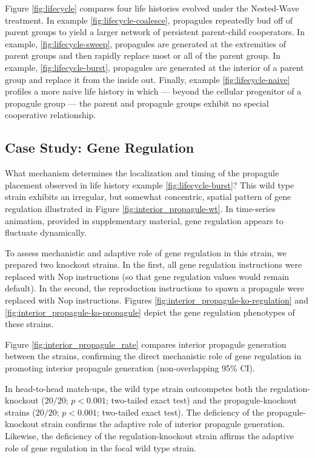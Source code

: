 Figure \ref{fig:lifecycle} compares four life histories evolved under the Nested-Wave treatment.
In example \ref{fig:lifecycle-coalesce}, propagules repeatedly bud off of parent groups to yield a larger network of persistent parent-child cooperators.
In example, \ref{fig:lifecycle-sweep}, propagules are generated at the extremities of parent groups and then rapidly replace most or all of the parent group.
In example, \ref{fig:lifecycle-burst}, propagules are generated at the interior of a parent group and replace it from the inside out.
Finally, example \ref{fig:lifecycle-naive} profiles a more naive life history in which --- beyond the cellular progenitor of a propagule group --- the parent and propagule groups exhibit no special cooperative relationship.

\subsection{Case Study: Gene Regulation} \label{sec:gene-regulation}



What mechanism determines the localization and timing of the propagule placement observed in life history example \ref{fig:lifecycle-burst}?
This wild type strain exhibits an irregular, but somewhat concentric, spatial pattern of gene regulation illustrated in Figure \ref{fig:interior_propagule-wt}.
In time-series animation, provided in supplementary material, gene regulation appears to fluctuate dynamically.

To assess mechanistic and adaptive role of gene regulation in this strain, we prepared two knockout strains.
In the first, all gene regulation instructions were replaced with Nop instructions (so that gene regulation values would remain default).
In the second, the reproduction instructions to spawn a propagule were replaced with Nop instructions.
Figures \ref{fig:interior_propagule-ko-regulation} and \ref{fig:interior_propagule-ko-propagule} depict the gene regulation phenotypes of these strains.

Figure \ref{fig:interior_propagule_rate} compares interior propagule generation between the strains, confirming the direct mechanistic role of gene regulation in promoting interior propagule generation (non-overlapping 95\% CI).

In head-to-head match-ups, the wild type strain outcompetes both the regulation-knockout ($20/20$; $p < 0.001$; two-tailed exact test) and the propagule-knockout strains
($20/20$; $p < 0.001$; two-tailed exact test).
The deficiency of the propagule-knockout strain confirms the adaptive role of interior propagule generation.
Likewise, the deficiency of the regulation-knockout strain affirms the adaptive role of gene regulation in the focal wild type strain.


